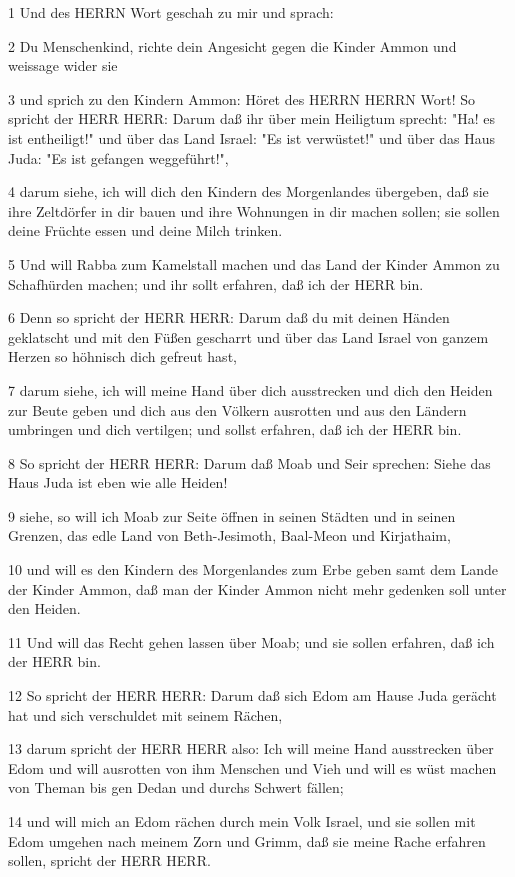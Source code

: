 \par 1 Und des HERRN Wort geschah zu mir und sprach:
\par 2 Du Menschenkind, richte dein Angesicht gegen die Kinder Ammon und weissage wider sie
\par 3 und sprich zu den Kindern Ammon: Höret des HERRN HERRN Wort! So spricht der HERR HERR: Darum daß ihr über mein Heiligtum sprecht: "Ha! es ist entheiligt!" und über das Land Israel: "Es ist verwüstet!" und über das Haus Juda: "Es ist gefangen weggeführt!",
\par 4 darum siehe, ich will dich den Kindern des Morgenlandes übergeben, daß sie ihre Zeltdörfer in dir bauen und ihre Wohnungen in dir machen sollen; sie sollen deine Früchte essen und deine Milch trinken.
\par 5 Und will Rabba zum Kamelstall machen und das Land der Kinder Ammon zu Schafhürden machen; und ihr sollt erfahren, daß ich der HERR bin.
\par 6 Denn so spricht der HERR HERR: Darum daß du mit deinen Händen geklatscht und mit den Füßen gescharrt und über das Land Israel von ganzem Herzen so höhnisch dich gefreut hast,
\par 7 darum siehe, ich will meine Hand über dich ausstrecken und dich den Heiden zur Beute geben und dich aus den Völkern ausrotten und aus den Ländern umbringen und dich vertilgen; und sollst erfahren, daß ich der HERR bin.
\par 8 So spricht der HERR HERR: Darum daß Moab und Seir sprechen: Siehe das Haus Juda ist eben wie alle Heiden!
\par 9 siehe, so will ich Moab zur Seite öffnen in seinen Städten und in seinen Grenzen, das edle Land von Beth-Jesimoth, Baal-Meon und Kirjathaim,
\par 10 und will es den Kindern des Morgenlandes zum Erbe geben samt dem Lande der Kinder Ammon, daß man der Kinder Ammon nicht mehr gedenken soll unter den Heiden.
\par 11 Und will das Recht gehen lassen über Moab; und sie sollen erfahren, daß ich der HERR bin.
\par 12 So spricht der HERR HERR: Darum daß sich Edom am Hause Juda gerächt hat und sich verschuldet mit seinem Rächen,
\par 13 darum spricht der HERR HERR also: Ich will meine Hand ausstrecken über Edom und will ausrotten von ihm Menschen und Vieh und will es wüst machen von Theman bis gen Dedan und durchs Schwert fällen;
\par 14 und will mich an Edom rächen durch mein Volk Israel, und sie sollen mit Edom umgehen nach meinem Zorn und Grimm, daß sie meine Rache erfahren sollen, spricht der HERR HERR.
